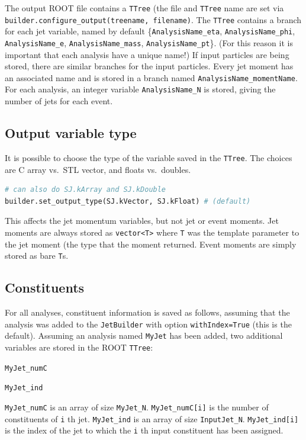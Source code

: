 \documentclass{article}
\newcommand{\prog}[1]{{\sc #1}\xspace}
\newcommand{\code}[1]{{\tt #1}\xspace}
\newcommand{\codes}[1]{{\tt #1}s\xspace}
\begin{document}
The output \prog{ROOT} file contains a \code{TTree} (the file and \code{TTree} name are set via \code{builder.configure\_output(treename, filename)}.  The \code{TTree} contains a branch for each jet variable, named by default \{\code{AnalysisName\_eta}, \code{AnalysisName\_phi}, \code{AnalysisName\_e}, \code{AnalysisName\_mass}, \code{AnalysisName\_pt}\}.  (For this reason it is important that each analysis have a unique name!)  If input particles are being stored, there are similar branches for the input particles.  Every jet moment has an associated name and is stored in a branch named \code{AnalysisName\_momentName}.  For each analysis, an integer variable \code{AnalysisName\_N} is stored, giving the number of jets for each event.

\subsection{Output variable type}
It is possible to choose the type of the variable saved in the \code{TTree}.
The choices are C array vs.~STL vector, and floats vs.~doubles.
\begin{lstlisting}[language=Python]
# can also do SJ.kArray and SJ.kDouble
builder.set_output_type(SJ.kVector, SJ.kFloat) # (default)
\end{lstlisting}
This affects the jet momentum variables, but not jet or event moments.  Jet moments are always stored as \code{vector<T>} where \code{T} was the template parameter to the jet moment (the type that the moment returned.  Event moments are simply stored as bare \codes{T}.

\subsection{Constituents}
For all analyses, constituent information is saved as follows, assuming that the analysis was added to the \code{JetBuilder} with option \code{withIndex=True} (this is the default).  Assuming an analysis named \code{MyJet} has been added, two additional variables are stored in the \prog{ROOT} \code{TTree}:

\code{MyJet\_numC}

\code{MyJet\_ind}

\code{MyJet\_numC} is an array of size \code{MyJet\_N}.  \code{MyJet\_numC[i]} is the number of constituents of \code{i}th jet.  \code{MyJet\_ind} is an array of size \code{InputJet\_N}.  \code{MyJet\_ind[i]} is the index of the jet to which the \code{i}th input constituent has been assigned.
\end{document}
